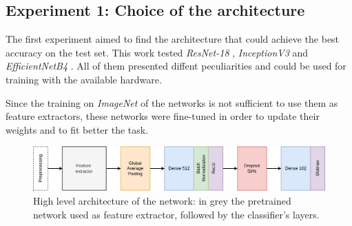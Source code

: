 \subsection{Experiment 1: Choice of the architecture}\label{sec:exp1}
The first experiment aimed to find the architecture that could achieve the best accuracy on the test set. This work tested \textit{ResNet-18} \cite{he2015deep}, \textit{InceptionV3} \cite{szegedy2015going} and 
\textit{EfficientNetB4} \cite{tan2019efficientnet}. All of them presented diffent peculiarities and could be used for training with the available hardware. \par
Since the training on \textit{ImageNet} of the networks is not sufficient to use them as feature extractors, these networks were fine-tuned in order to update their weights and to fit better the task.\par
\begin{figure}[ht!]
\centering
\includegraphics[width=1\textwidth]{images/architecture.png} 
\caption{High level architecture of the network: in grey the pretrained network used as feature extractor, followed by the classifier's layers.}
\label{fig:architecture}
\end{figure}




